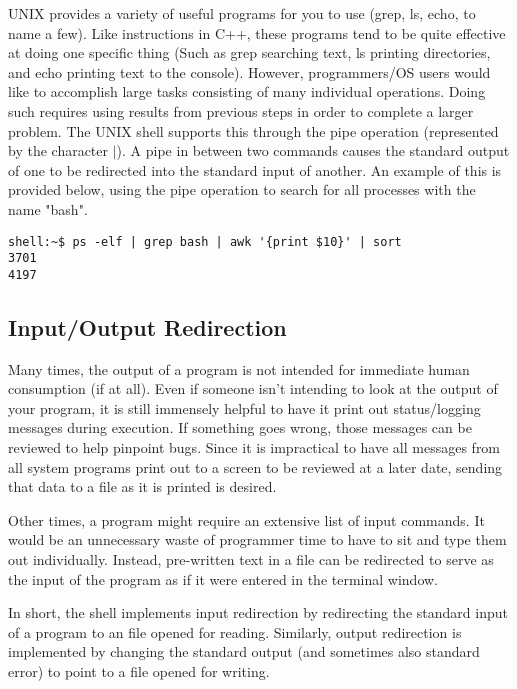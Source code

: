 \documentclass[12pt]{article}
\begin{document}
UNIX provides a variety of useful programs for you to use (grep, ls, echo, to name a few).  Like instructions in C++, these programs tend to be quite effective at doing one specific thing (Such as grep searching text, ls printing directories, and echo printing text to the console).  However, programmers/OS users would like to accomplish large tasks consisting of many individual operations.  Doing such requires using results from previous steps in order to complete a larger problem.  The UNIX shell supports this through the pipe operation (represented by the character $\vert$).  A pipe in between two commands causes the standard output of one to be redirected into the standard input of another.  An example of this is provided below, using the pipe operation to search for all processes with the name "bash".

\begin{center}
\begin{lstlisting}[style=bash]
shell:~$ ps -elf | grep bash | awk '{print $10}' | sort 
3701
4197
\end{lstlisting}
\end{center}

\subsection*{Input/Output Redirection}

Many times, the output of a program is not intended for immediate human consumption (if at all).  Even if someone isn't intending to look at the output of your program, it is still immensely helpful to have it print out status/logging messages during execution.  If something goes wrong, those messages can be reviewed to help pinpoint bugs.  Since it is impractical to have all messages from all system programs print out to a screen to be reviewed at a later date, sending that data to a file as it is printed is desired.


Other times, a program might require an extensive list of input commands.  It would be an unnecessary waste of programmer time to have to sit and type them out individually.  Instead, pre-written text in a file can be redirected to serve as the input of the program as if it were entered in the terminal window.

In short, the shell implements input redirection by redirecting the standard input of a program to an file opened for reading.  Similarly, output redirection is implemented by changing the standard output (and sometimes also standard error) to point to a file opened for writing.
\end{document}
